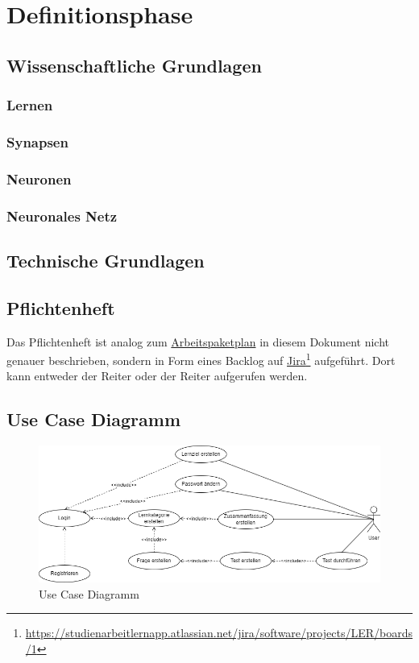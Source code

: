 \section{Definitionsphase}

\subsection{Wissenschaftliche Grundlagen}
\subsubsection{Lernen}
\subsubsection{Synapsen}
\subsubsection{Neuronen}
\subsubsection{Neuronales Netz}
\subsection{Technische Grundlagen}


\subsection{Pflichtenheft}
Das Pflichtenheft ist analog zum \hyperref[sec:arbeitspaketplan]{Arbeitspaketplan} in diesem Dokument nicht genauer beschrieben, sondern in Form eines Backlog auf \href{https://studienarbeitlernapp.atlassian.net/jira/software/projects/LER/boards/1}{\underline{Jira}}\footnote{\href{https://studienarbeitlernapp.atlassian.net/jira/software/projects/LER/boards/1}{https://studienarbeitlernapp.atlassian.net/jira/software/projects/LER/boards/1}} aufgeführt. 
Dort kann entweder der Reiter  oder der Reiter  aufgerufen werden. 

\subsection{Use Case Diagramm}


\begin{figure}[H]
    \centering
    \includegraphics[width=1\textwidth]{images/diagramme/UseCase_Diagramm.png}
    \caption{Use Case Diagramm}
    \label{fig:UseCaseDiagramm}
\end{figure}
\newpage
